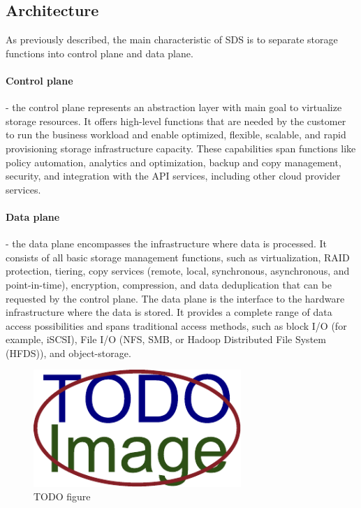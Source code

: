     \subsection{Architecture}
    As previously described, the main characteristic of SDS is to separate storage functions into control plane and data plane.

    \paragraph{Control plane}
    - the control plane represents an abstraction layer with main goal to virtualize storage resources. It offers high-level functions that are needed by the customer to run the business workload and enable optimized, flexible, scalable, and rapid provisioning storage infrastructure capacity. These capabilities span functions like policy automation, analytics and optimization, backup and copy management, security, and integration with the API services, including other cloud provider services\cite{sdsIBMSDSGuide}.

    \paragraph{Data plane}
    - the data plane encompasses the infrastructure where data is processed. It consists of all basic storage management functions, such as virtualization, RAID protection, tiering, copy services (remote, local, synchronous, asynchronous, and point-in-time), encryption, compression, and data deduplication that can be requested by the control plane. The data plane is the interface to the hardware infrastructure where the data is stored. It provides a complete range of data access possibilities and spans traditional access methods, such as block I/O (for example, iSCSI), File I/O (NFS, SMB, or Hadoop Distributed File System (HFDS)), and object-storage\cite{sdsIBMSDSGuide}.

    \begin{figure}[hbt]
        \centering
        \includegraphics[width=0.7\textwidth]{obrazky-figures/placeholder.pdf}
        \caption{TODO figure}
    \end{figure}

